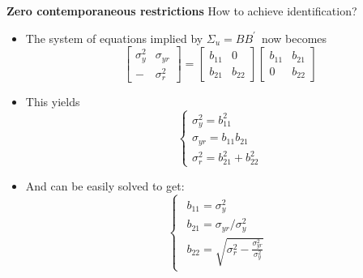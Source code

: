 \begin{frame}
{\textbf{Zero contemporaneous restrictions }}{How to achieve identification?}
\vspace{-.25cm}

\begin{itemize}
\item The system of equations implied by $\Sigma _{u}=BB^{\prime }$\ now
becomes 
\begin{equation*}
\left[ 
\begin{array}{cc}
\sigma _{y}^{2} & \sigma _{yr} \\ 
- & \sigma _{r}^{2}%
\end{array}%
\right] =\left[ 
\begin{array}{cc}
b_{11} & 0 \\ 
b_{21} & b_{22}%
\end{array}%
\right] \left[ 
\begin{array}{cc}
b_{11} & b_{21} \\ 
0 & b_{22}%
\end{array}%
\right]
\end{equation*}
\pause

\item This yields%
\begin{equation*}
\left\{ 
\begin{array}{l}
\sigma _{y}^{2}=b_{11}^{2} \\ 
\sigma _{yr}=b_{11}b_{21} \\ 
\sigma _{r}^{2}=b_{21}^{2}+b_{22}^{2}%
\end{array}%
\right.
\end{equation*}
\pause

\item And can be easily solved to get:%
\begin{equation*}
\left\{ 
\begin{array}{l}
\begin{array}{c}
b_{11}=\sigma _{y}^{2} \\ 
b_{21}=\sigma _{yr}/\sigma _{y}^{2} \\ 
b_{22}=\sqrt{\sigma _{r}^{2}-\frac{\sigma _{yr}^{2}}{\sigma _{y}^{2}}}%
\end{array}%
\end{array}%
\right.
\end{equation*}
\end{itemize}
\end{frame}


